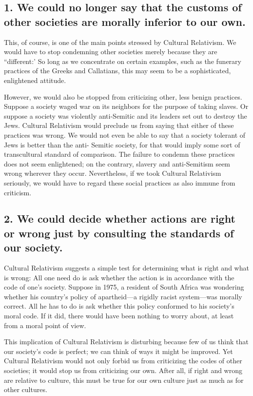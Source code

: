 \subsection{1. We could no longer say that the customs of other societies are morally 
inferior to our own.} 
This, of course, is one of the main points stressed by 
Cultural  Relativism. We  would  have to  stop condemning  other  societies 
merely  because  they  are  ``different:'  So  long  as  we  concentrate  on 
certain  examples,  such  as  the  funerary  practices  of  the  Greeks  and 
Callatians, this may seem to be a sophisticated, enlightened attitude. 

However,  we  would  also  be  stopped  from  criticizing  other,  less  benign 
practices. Suppose a society waged war on its neighbors for the purpose 
of taking slaves. Or suppose a society was violently anti-Semitic and its 
leaders  set  out  to  destroy the  Jews.  Cultural  Relativism  would  preclude 
us  from  saying that  either  of  these  practices  was  wrong. We  would  not 
even be able to say that a society tolerant of Jews is better than the anti-
Semitic society, for  that would imply some  sort of transcultural standard 
of  comparison.  The  failure  to  condemn  these  practices  does  not  seem 
enlightened;  on  the  contrary,  slavery  and  anti-Semitism  seem  wrong 
wherever they occur. Nevertheless, if we took Cultural Relativism 
seriously,  we  would  have  to  regard  these social  practices  as  also 
immune from criticism. 

\subsection{2. We could decide whether actions are right or wrong just by consulting 
the  standards of  our  society.}
Cultural  Relativism  suggests  a  simple test 
for  determining  what  is  right  and  what  is  wrong:  All  one  need  do  is  ask 
whether  the  action  is  in  accordance  with  the  code  of  one's  society. 
Suppose in 1975, a resident of South Africa was wondering whether his 
country's policy of apartheid—a rigidly racist system—was morally 
correct.  All  he  has  to  do  is  ask  whether  this  policy  conformed  to  his 
society's  moral  code.  If  it  did,  there  would  have  been  nothing  to  worry 
about, at least from a moral point of view. 

This  implication  of  Cultural  Relativism  is  disturbing  because  few  of  us 
think that our society's code is perfect; we can think of ways it might be 
improved. Yet Cultural Relativism would not only forbid us from criticizing 
the  codes  of  other  societies;  it  would  stop  us  from  criticizing  our  own. 
After  all,  if  right  and  wrong  are  relative  to  culture,  this  must  be  true  for 
our own culture just as much as for other cultures. 

